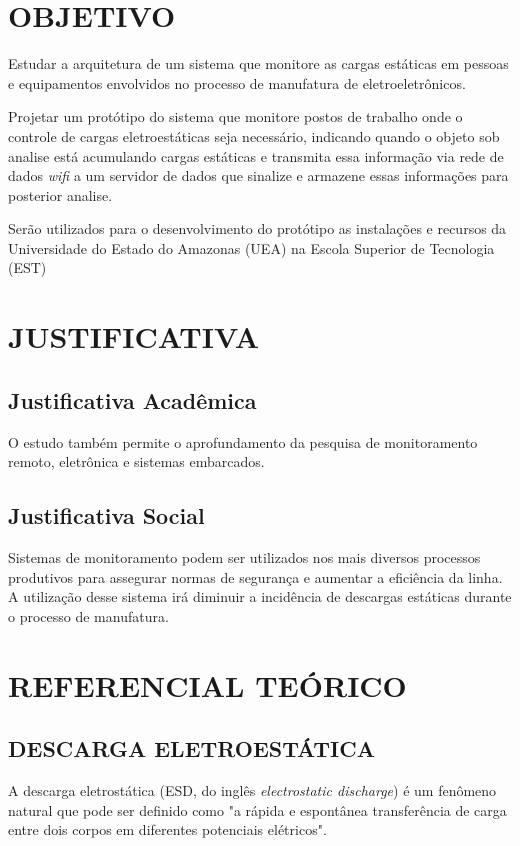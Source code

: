 \documentclass[
	12pt,				%
	openright,			%
	oneside,			%
	a4paper,			%
	chapter=TITLE,		%
	english,			%
	french,				%
	spanish,			%
	brazil,				%
	article,			%
	]{uea-abntex2}
\begin{document}
\section{OBJETIVO}
Estudar a arquitetura de um sistema que monitore as cargas estáticas em pessoas e equipamentos envolvidos no processo de manufatura de eletroeletrônicos.

Projetar um protótipo do sistema que monitore postos de trabalho onde o controle de cargas eletroestáticas seja necessário, indicando quando o objeto sob analise está acumulando cargas estáticas e transmita essa informação via rede de dados \textit{wifi} a um servidor de dados que sinalize e armazene essas informações para posterior analise.

Serão utilizados para o desenvolvimento do protótipo as instalações e recursos da Universidade do Estado do Amazonas (UEA) na Escola Superior de Tecnologia (EST)
\section{JUSTIFICATIVA}

\subsection{Justificativa Acadêmica}
O estudo também permite o aprofundamento da pesquisa de monitoramento remoto, eletrônica e sistemas embarcados.
\subsection{Justificativa Social}
Sistemas de monitoramento podem ser utilizados nos mais diversos processos produtivos para assegurar normas de segurança e aumentar a eficiência da linha.
A utilização desse sistema irá diminuir a incidência de descargas estáticas durante o processo de manufatura.
\section{REFERENCIAL TEÓRICO}

\subsection{DESCARGA ELETROESTÁTICA}
A descarga eletrostática (ESD, do inglês \textit{electrostatic
discharge}) é um fenômeno natural que pode ser definido como "a rápida e espontânea transferência de carga entre dois corpos em diferentes potenciais elétricos".\cite{esda}
\end{document}
